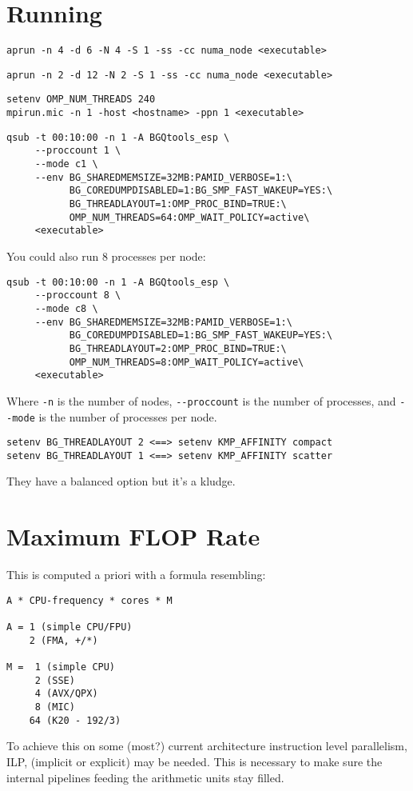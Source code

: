 \section{Running}

\begin{verbatim}
aprun -n 4 -d 6 -N 4 -S 1 -ss -cc numa_node <executable>
\end{verbatim}

\begin{verbatim}
aprun -n 2 -d 12 -N 2 -S 1 -ss -cc numa_node <executable>
\end{verbatim}

\begin{verbatim}
setenv OMP_NUM_THREADS 240
mpirun.mic -n 1 -host <hostname> -ppn 1 <executable>
\end{verbatim}

\begin{verbatim}
qsub -t 00:10:00 -n 1 -A BGQtools_esp \
     --proccount 1 \
     --mode c1 \
     --env BG_SHAREDMEMSIZE=32MB:PAMID_VERBOSE=1:\
           BG_COREDUMPDISABLED=1:BG_SMP_FAST_WAKEUP=YES:\
           BG_THREADLAYOUT=1:OMP_PROC_BIND=TRUE:\
           OMP_NUM_THREADS=64:OMP_WAIT_POLICY=active\
     <executable>
\end{verbatim}
You could also run 8 processes per node:
\begin{verbatim}
qsub -t 00:10:00 -n 1 -A BGQtools_esp \
     --proccount 8 \
     --mode c8 \
     --env BG_SHAREDMEMSIZE=32MB:PAMID_VERBOSE=1:\
           BG_COREDUMPDISABLED=1:BG_SMP_FAST_WAKEUP=YES:\
           BG_THREADLAYOUT=2:OMP_PROC_BIND=TRUE:\
           OMP_NUM_THREADS=8:OMP_WAIT_POLICY=active\
     <executable>
\end{verbatim}
Where \verb|-n| is the number of nodes, \verb|--proccount| is the number of
processes, and \verb|--mode| is the number of processes per node.
\begin{verbatim}
setenv BG_THREADLAYOUT 2 <==> setenv KMP_AFFINITY compact
setenv BG_THREADLAYOUT 1 <==> setenv KMP_AFFINITY scatter
\end{verbatim}
They have a balanced option but it's a kludge.

\section{Maximum FLOP Rate}
This is computed a priori with a formula resembling:
\begin{verbatim}
A * CPU-frequency * cores * M

A = 1 (simple CPU/FPU)
    2 (FMA, +/*)

M =  1 (simple CPU)
     2 (SSE)
     4 (AVX/QPX)
     8 (MIC)
    64 (K20 - 192/3)
\end{verbatim}
To achieve this on some (most?) current architecture instruction level
parallelism, ILP, (implicit or explicit) may be needed.  This is necessary to
make sure the internal pipelines feeding the arithmetic units stay filled.
